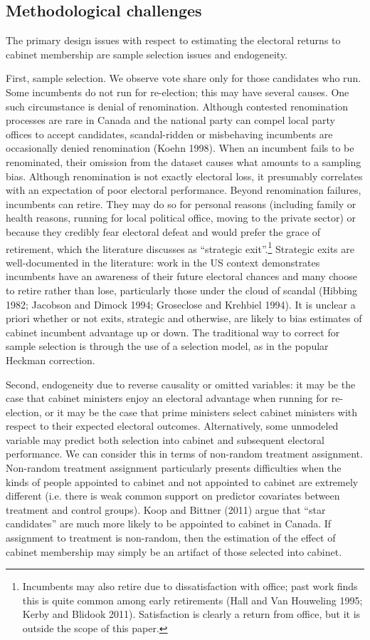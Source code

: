 \documentclass[letter,12pt]{article}
\begin{document}
\subsection*{Methodological challenges}
The primary design issues with respect to estimating the electoral returns to cabinet membership are sample selection issues and endogeneity.

First, sample selection. We observe vote share only for those candidates who run. Some incumbents do not run for re-election; this may have several causes. One such circumstance is denial of renomination. Although contested renomination processes are rare in Canada and the national party can compel local party offices to accept candidates, scandal-ridden or misbehaving incumbents are occasionally denied renomination (Koehn 1998). When an incumbent fails to be renominated, their omission from the dataset causes what amounts to a sampling bias. Although renomination is not exactly electoral loss, it presumably correlates with an expectation of poor electoral performance. Beyond renomination failures, incumbents can retire. They may do so for personal reasons (including family or health reasons, running for local political office, moving to the private sector) or because they credibly fear electoral defeat and would prefer the grace of retirement, which the literature discusses as ``strategic exit''.\footnote{Incumbents may also retire due to dissatisfaction with office; past work finds this is quite common among early retirements (Hall and Van Houweling 1995; Kerby and Blidook 2011). Satisfaction is clearly a return from office, but it is outside the scope of this paper.} Strategic exits are well-documented in the literature: work in the US context demonstrates incumbents have an awareness of their future electoral chances and many choose to retire rather than lose, particularly those under the cloud of scandal (Hibbing 1982; Jacobson and Dimock 1994; Groseclose and Krehbiel 1994). It is unclear a priori whether or not exits, strategic and otherwise, are likely to bias estimates of cabinet incumbent advantage up or down. The traditional way to correct for sample selection is through the use of a selection model, as in the popular Heckman correction.

Second, endogeneity due to reverse causality or omitted variables: it may be the case that cabinet ministers enjoy an electoral advantage when running for re-election, or it may be the case that prime ministers select cabinet ministers with respect to their expected electoral outcomes. Alternatively, some unmodeled variable may predict both selection into cabinet and subsequent electoral performance. We can consider this in terms of non-random treatment assignment. Non-random treatment assignment particularly presents difficulties when the kinds of people appointed to cabinet and not appointed to cabinet are extremely different (i.e. there is weak common support on predictor covariates between treatment and control groups). Koop and Bittner (2011) argue that ``star candidates'' are much more likely to be appointed to cabinet in Canada. If assignment to treatment is non-random, then the estimation of the effect of cabinet membership may simply be an artifact of those selected into cabinet.
\end{document}
